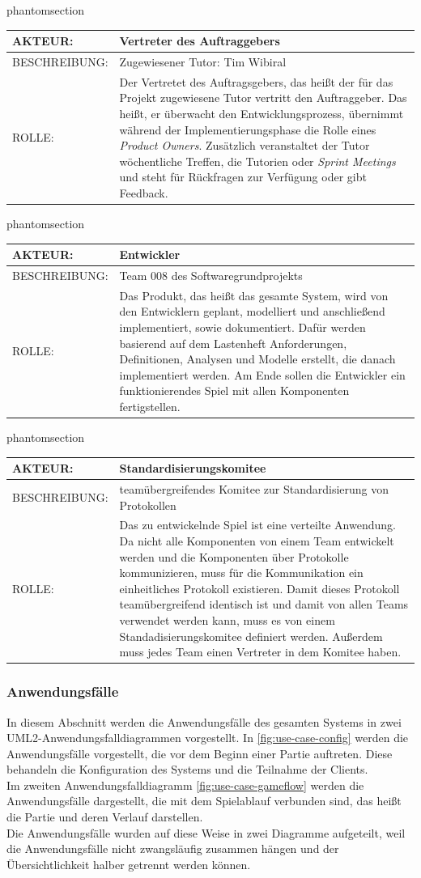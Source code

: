 \documentclass[12pt]{article}
\makeatletter
\newcommand{\labeltext}[2]{%
  \@bsphack
  \csname phantomsection\endcsname %
  \def\@currentlabel{#1}{\label{#2}}%
  \@esphack
}
\newcounter{fa}
\newcommand{\akteur}[4]{
\labeltext{#2}{#1}
\begin{tabularx}{16cm}{|l|X|}
\hline 
AKTEUR: & #2 \\
\hline
BESCHREIBUNG: & #3 \\
\hline
ROLLE: & #4 \\ 
\hline
\end{tabularx}
}
\makeatother
\begin{document}
\akteur{A-Tutor}{Vertreter des Auftraggebers}{Zugewiesener Tutor: Tim Wibiral}{Der Vertretet des Auftragsgebers, das heißt der für das Projekt zugewiesene Tutor vertritt den Auftraggeber. Das heißt, er überwacht den Entwicklungsprozess, übernimmt während der Implementierungsphase die Rolle eines \textit{Product Owners}. Zusätzlich veranstaltet der Tutor wöchentliche Treffen, die Tutorien oder \textit{Sprint Meetings} und steht für Rückfragen zur Verfügung oder gibt Feedback.}

\akteur{A-Entwickler}{Entwickler}{Team 008 des Softwaregrundprojekts}{Das Produkt, das heißt das gesamte System, wird von den Entwicklern geplant, modelliert und anschließend implementiert, sowie dokumentiert. Dafür werden basierend auf dem Lastenheft Anforderungen, Definitionen, Analysen und Modelle erstellt, die danach implementiert werden. Am Ende sollen die Entwickler ein funktionierendes Spiel mit allen Komponenten fertigstellen.}

\akteur{A-Standardisierungskomitee}{Standardisierungskomitee}{teamübergreifendes Komitee zur Standardisierung von Protokollen}{Das zu entwickelnde Spiel ist eine verteilte Anwendung. Da nicht alle Komponenten von einem Team entwickelt werden und die Komponenten über Protokolle kommunizieren, muss für die Kommunikation ein einheitliches Protokoll existieren. Damit dieses Protokoll teamübergreifend identisch ist und damit von allen Teams verwendet werden kann, muss es von einem Standadisierungskomitee definiert werden. Außerdem muss jedes Team einen Vertreter in dem Komitee haben.}

\subsubsection{Anwendungsfälle}
\label{sssec:use-cases}

In diesem Abschnitt werden die Anwendungsfälle des gesamten Systems in zwei UML2-Anwendungsfalldiagrammen vorgestellt. In \autoref{fig:use-case-config} werden die Anwendungsfälle vorgestellt, die vor dem Beginn einer Partie auftreten. Diese behandeln die Konfiguration des Systems und die Teilnahme der Clients. \\ Im zweiten Anwendungsfalldiagramm \autoref{fig:use-case-gameflow} werden die Anwendungsfälle dargestellt, die mit dem Spielablauf verbunden sind, das heißt die Partie und deren Verlauf darstellen. \\ Die Anwendungsfälle wurden auf diese Weise in zwei Diagramme aufgeteilt, weil die Anwendungsfälle nicht zwangsläufig zusammen hängen und der Übersichtlichkeit halber getrennt werden können. \\ 
\end{document}
